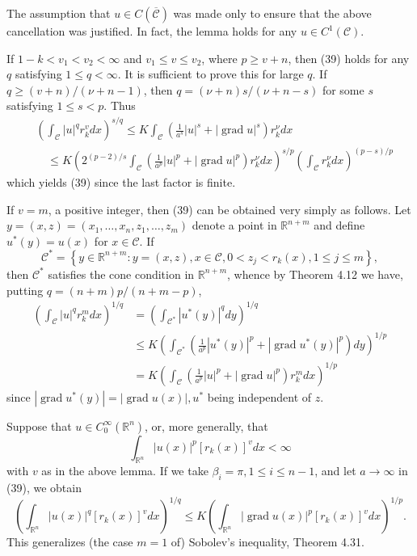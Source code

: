 \begin{remarks}
  \item The assumption that $u \in C(\overline{\mathcal{C}})$ was made only to ensure that the above cancellation was justified. In fact, the lemma holds for any $u \in C^1(\mathcal{C})$.
  \item If $1-k<v_1<v_2<\infty$ and $v_1 \leq v \leq v_2$, where $p \geq v+n$, then (39) holds for any $q$ satisfying $1 \leq q<\infty$. It is sufficient to prove this for large $q$. If $q \geq(v+n) /(\nu+n-1)$, then $q=(\nu+n) s /(\nu+n-s)$ for some $s$ satisfying $1 \leq s<p$. Thus
  \[
  \begin{aligned}
  & \left(\int_{\mathcal{C}}|u|^q r_k^v d x\right)^{s / q} \leq K \int_{\mathcal{C}}\left(\frac{1}{a^s}|u|^s+|\operatorname{grad} u|^s\right) r_k^\nu d x \\
  & \quad \leq K\left(2^{(p-2) / s} \int_{\mathcal{C}}\left(\frac{1}{a^p}|u|^p+|\operatorname{grad} u|^p\right) r_k^\nu d x\right)^{s / p}\left(\int_{\mathcal{C}} r_k^\nu d x\right)^{(p-s) / p}
  \end{aligned}
  \]
  which yields (39) since the last factor is finite.
  \item If $v=m$, a positive integer, then (39) can be obtained very simply as follows. Let $y=(x, z)=\left(x_1, \ldots, x_n, z_1, \ldots, z_m\right)$ denote a point in $\mathbb{R}^{n+m}$ and define $u^*(y)=u(x)$ for $x \in \mathcal{C}$. If
  \[
  \mathcal{C}^*=\left\{y \in \mathbb{R}^{n+m}: y=(x, z), x \in \mathcal{C}, 0<z_j<r_k(x), 1 \leq j \leq m\right\},
  \]
  then $\mathcal{C}^*$ satisfies the cone condition in $\mathbb{R}^{n+m}$, whence by Theorem 4.12 we have, putting $q=(n+m) p /(n+m-p)$,
  \[
  \begin{aligned}
  \left(\int_{\mathcal{C}}|u|^q r_k^m d x\right)^{1 / q} & =\left(\int_{\mathcal{C}^*}\left|u^*(y)\right|^q d y\right)^{1 / q} \\
  & \leq K\left(\int_{\mathcal{C}^*}\left(\frac{1}{a^p}\left|u^*(y)\right|^p+\left|\operatorname{grad} u^*(y)\right|^p\right) d y\right)^{1 / p} \\
  & =K\left(\int_{\mathcal{C}}\left(\frac{1}{a^p}|u|^p+|\operatorname{grad} u|^p\right) r_k^m d x\right)^{1 / p}
  \end{aligned}
  \]
  since $\left|\operatorname{grad} u^*(y)\right|=|\operatorname{grad} u(x)|, u^*$ being independent of $z$.
  \item Suppose that $u \in C_0^{\infty}\left(\mathbb{R}^n\right)$, or, more generally, that
  \[
  \int_{\mathbb{R}^n}|u(x)|^p\left[r_k(x)\right]^v d x<\infty
  \]
  with $v$ as in the above lemma. If we take $\beta_i=\pi, 1 \leq i \leq n-1$, and let $a \rightarrow \infty$ in (39), we obtain
  \[
  \left(\int_{\mathbb{R}^n}|u(x)|^q\left[r_k(x)\right]^v d x\right)^{1 / q} \leq K\left(\int_{\mathbb{R}^n}|\operatorname{grad} u(x)|^p\left[r_k(x)\right]^v d x\right)^{1 / p} .
  \]
  This generalizes (the case $m=1$ of) Sobolev's inequality, Theorem 4.31.
\end{remarks}

